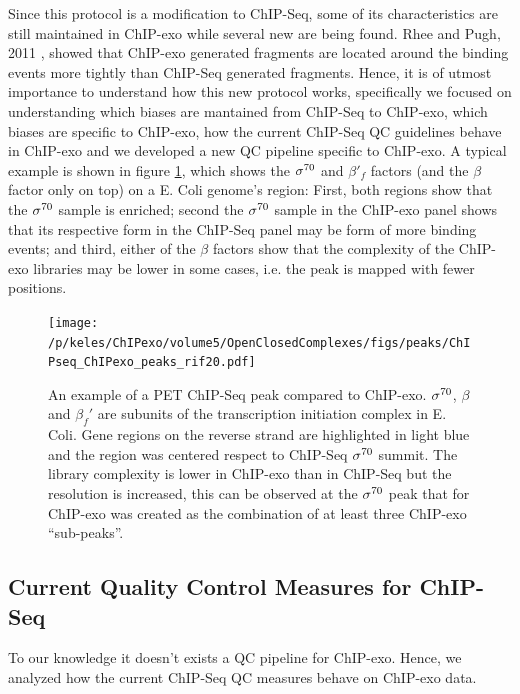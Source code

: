 \documentclass[11pt]{article}\usepackage[]{graphicx}\usepackage[]{color}
\begin{document}
Since this protocol is a modification to ChIP-Seq, some of its
characteristics are still maintained in ChIP-exo while several new are
being found. Rhee and Pugh, 2011 \cite{exo1}, showed that ChIP-exo
generated fragments are located around the binding events more tightly
than ChIP-Seq generated fragments. Hence, it is of utmost importance
to understand how this new protocol works, specifically we focused on
understanding which biases are mantained from ChIP-Seq to ChIP-exo,
which biases are specific to ChIP-exo, how the current ChIP-Seq QC
guidelines behave in ChIP-exo and we developed a new QC pipeline
specific to ChIP-exo. A typical example is shown in figure
\ref{fig:exo_example}, which shows the $\sigma^{70}$ and $\beta'_f$ factors
(and the $\beta$ factor only on top) on a E. Coli genome's region:
First, both regions show that the $\sigma^{70}$ sample is enriched; second
the $\sigma^{70}$ sample in the ChIP-exo panel shows that its respective form
in the ChIP-Seq panel may be form of more binding events; and third,
either of the $\beta$ factors show that the complexity of the ChIP-exo
libraries may be lower in some cases, i.e. the peak is mapped with
fewer positions.

\begin{figure}[H]
  \centering
  \texttt{[image: /p/keles/ChIPexo/volume5/OpenClosedComplexes/figs/peaks/ChIPseq\_ChIPexo\_peaks\_rif20.pdf]}
  \caption{An example of a PET ChIP-Seq peak compared to
    ChIP-exo. $\sigma^{70}$, $\beta$ and $\beta_f'$ are subunits of
    the transcription initiation complex in E. Coli. Gene regions on
    the reverse strand are highlighted in light blue and the region
    was centered respect to ChIP-Seq $\sigma^{70}$ summit. The library
    complexity is lower in ChIP-exo than in ChIP-Seq but the
    resolution is increased, this can be observed at the $\sigma^{70}$
    peak that for ChIP-exo was created as the combination of at least
    three ChIP-exo ``sub-peaks''.}
  \label{fig:exo_example}
\end{figure}

\subsection{Current Quality Control Measures for ChIP-Seq}
\label{sec:QC_chipseq}

To our knowledge it doesn't exists a QC pipeline for ChIP-exo. Hence,
we analyzed how the current ChIP-Seq QC measures behave on ChIP-exo
data.
\end{document}
